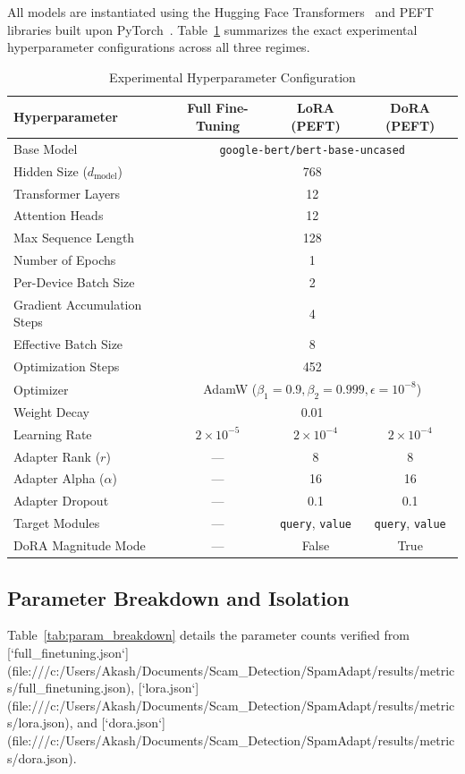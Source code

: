 \documentclass[conference]{IEEEtran}
\begin{document}
All models are instantiated using the Hugging Face Transformers~\cite{wolf2020transformers} and PEFT~\cite{peft2022} libraries built upon PyTorch~\cite{paszke2019pytorch}. Table~\ref{tab:hyperparams} summarizes the exact experimental hyperparameter configurations across all three regimes.

\begin{table}[htbp]
\caption{Experimental Hyperparameter Configuration}
\label{tab:hyperparams}
\centering
\begin{tabular}{lccc}
\toprule
\textbf{Hyperparameter} & \textbf{Full Fine-Tuning} & \textbf{LoRA (PEFT)} & \textbf{DoRA (PEFT)} \\
\midrule
Base Model & \multicolumn{3}{c}{\texttt{google-bert/bert-base-uncased}} \\
Hidden Size ($d_{\text{model}}$) & \multicolumn{3}{c}{768} \\
Transformer Layers & \multicolumn{3}{c}{12} \\
Attention Heads & \multicolumn{3}{c}{12} \\
Max Sequence Length & \multicolumn{3}{c}{128} \\
Number of Epochs & \multicolumn{3}{c}{1} \\
Per-Device Batch Size & \multicolumn{3}{c}{2} \\
Gradient Accumulation Steps & \multicolumn{3}{c}{4} \\
Effective Batch Size & \multicolumn{3}{c}{8} \\
Optimization Steps & \multicolumn{3}{c}{452} \\
Optimizer & \multicolumn{3}{c}{AdamW ($\beta_1=0.9, \beta_2=0.999, \epsilon=10^{-8}$)} \\
Weight Decay & \multicolumn{3}{c}{0.01} \\
Learning Rate & $2\times 10^{-5}$ & $2\times 10^{-4}$ & $2\times 10^{-4}$ \\
Adapter Rank ($r$) & --- & 8 & 8 \\
Adapter Alpha ($\alpha$) & --- & 16 & 16 \\
Adapter Dropout & --- & 0.1 & 0.1 \\
Target Modules & --- & \texttt{query}, \texttt{value} & \texttt{query}, \texttt{value} \\
DoRA Magnitude Mode & --- & False & True \\
\bottomrule
\end{tabular}
\end{table}

\subsection{Parameter Breakdown and Isolation}
Table~\ref{tab:param_breakdown} details the parameter counts verified from [`full_finetuning.json`](file:///c:/Users/Akash/Documents/Scam_Detection/SpamAdapt/results/metrics/full_finetuning.json), [`lora.json`](file:///c:/Users/Akash/Documents/Scam_Detection/SpamAdapt/results/metrics/lora.json), and [`dora.json`](file:///c:/Users/Akash/Documents/Scam_Detection/SpamAdapt/results/metrics/dora.json).
\end{document}

